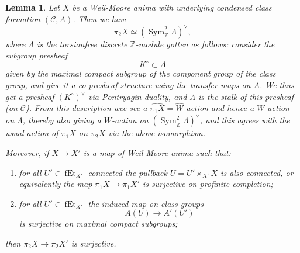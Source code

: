 \documentclass[12pt]{article}
\newtheorem{lemma}[theorem]{Lemma}
\theoremstyle{definition}
\newcommand{\on}{\operatorname}
\newcommand{\mc}{\mathcal}
\newcommand{\mbb}{\mathbb}
\newcommand{\wh}{\widehat}
\begin{document}
\begin{lemma}\label{pi2}
Let $X$ be a Weil-Moore anima with underlying condensed class formation $(\mc{C},A)$.  Then we have
$$\pi_2X \simeq \left(\on{Sym}^2_{\mbb{Z}}\Lambda\right)^\vee,$$
where $\Lambda$ is the torsionfree discrete $\mbb{Z}$-module gotten as follows: consider the subgroup presheaf
$$K^\circ \subset A$$
given by the maximal compact subgroup of the component group of the class group, and give it a \emph{co-presheaf} structure using the transfer maps on $A$.  We thus get a presheaf $(K^\circ)^\vee$ via Pontryagin duality, and $\Lambda$ is the stalk of this presheaf (on $\mc{C}$).  From this description wee see a $\wh{\pi_1X} = \wh{W}$-action and hence a $W$-action on $\Lambda$, thereby also giving a $W$-action on $\left(\on{Sym}^2_{\mbb{Z}}\Lambda\right)^\vee$, and this agrees with the usual action of $\pi_1X$ on $\pi_2X$ via the above isomorphism.

Moreover, if $X\to X'$ is a map of Weil-Moore anima such that:
\begin{enumerate}
\item for all $U'\in\on{fEt}_{X'}$ connected the pullback $U=U'\times_{X'}X$ is also connected, or equivalently the map $\pi_1X \to \pi_1X'$ is surjective on profinite completion;
\item for all $U'\in \on{fEt}_{X'}$ the induced map on class groups
$$A(U) \to A'(U')$$
is surjective on maximal compact subgroups;
\end{enumerate}
then $\pi_2X \to \pi_2 X'$ is surjective.
\end{lemma}
\end{document}
